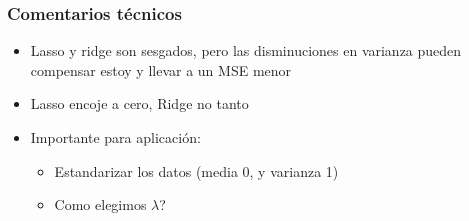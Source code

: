 \documentclass[
  shownotes,
  xcolor={svgnames},
  hyperref={colorlinks,citecolor=DarkBlue,linkcolor=DarkRed,urlcolor=DarkBlue}
  , aspectratio=169]{beamer}
\begin{document}
\begin{frame}[fragile]
\frametitle{Comentarios técnicos}

\begin{itemize}
 \item Lasso y ridge son sesgados, pero las disminuciones en varianza pueden compensar estoy y llevar a un MSE menor
 \medskip

 \item Lasso encoje a cero, Ridge no tanto
 \medskip
 \item Importante para aplicación:
\begin{itemize}
  \medskip
 \item Estandarizar los datos (media 0, y varianza 1)
 \medskip
 \item Como elegimos $\lambda$?
\end{itemize}
\end{itemize}

 \end{frame}
\end{document}
